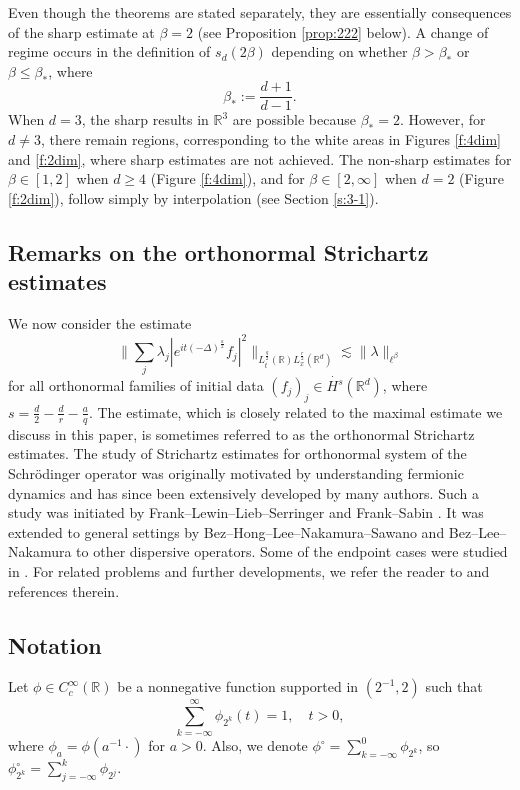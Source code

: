 \documentclass[a4paper]{amsart}
\numberwithin{figure}{section}
\numberwithin{equation}{section}%
\theoremstyle{plain}%
\theoremstyle{definition}
\theoremstyle{remark}%
\newcommand{\R}{{\mathbb R}}
\begin{document}
Even though the theorems are stated separately, they are essentially consequences of the sharp estimate at $\beta = 2$ (see Proposition \ref{prop:222} below). A change of regime occurs in the definition of $s_d(2\beta)$ depending on whether $\beta > \beta_\ast$ or $\beta \le \beta_\ast$, where
 \[\beta_\ast:=\frac{d+1}{d-1}.\] 
When $d = 3$, the sharp results in $\mathbb{R}^3$ are possible because $\beta_\ast = 2$. However, for $d \neq 3$, there remain regions, corresponding to the white areas in Figures \ref{f:4dim} and \ref{f:2dim}, where sharp estimates are not achieved. The non-sharp estimates for $\beta \in [1,2]$ when $d \ge 4$ (Figure \ref{f:4dim}), and for $\beta \in [2,\infty]$ when $d = 2$ (Figure \ref{f:2dim}), follow simply by interpolation (see Section \ref{s:3-1}).


\subsection{{Remarks on the orthonormal Strichartz estimates}}
We now consider the estimate
\begin{equation}
\label{e:onfs}
\Big\|\sum_j \lambda_j |e^{it(-\Delta)^{\frac a2}} f_j |^2\Big\|_{L_t^\frac q2(\R)L_x^\frac r2(\R^d)}
\lesssim
\|\lambda\|_{\ell^\beta}
\end{equation} 
for all orthonormal families of initial data $(f_j)_j\in \dot{H^s}(\R^d)$, where $s=\frac d2-\frac dr-\frac{a}q$.  The estimate, which is closely related to 
the maximal estimate we discuss in this paper, is sometimes referred to as the orthonormal Strichartz estimates.
The study of Strichartz estimates for orthonormal system of the Schr\"odinger operator was originally motivated by understanding fermionic dynamics and has since been extensively developed by many authors.
Such a study was initiated by Frank--Lewin--Lieb--Serringer \cite{FLLS} and Frank--Sabin \cite{FS_AJM}. It was extended to general  settings by Bez--Hong--Lee--Nakamura--Sawano \cite{BHLNS} and  Bez--Lee--Nakamura \cite{BLN_Forum} to other dispersive operators. Some of the endpoint cases were studied in \cite{BKS_TLMS, BKS_RIMS}. For related problems and further developments,  we refer the reader to \cite{CHP17,CHP18, FS_Survey, Ho23, Ho24, YLYL24} and references therein.

\subsection*{Notation}  
Let  $\phi\in C_c^\infty(\R)$ be a nonnegative function supported in $(2^{-1}, 2)$ such that 
\[ \sum_{k=-\infty}^\infty  \phi_{2^k} (t)=1, \quad t>0, \]
where $\phi_a=\phi(a^{-1}\cdot)$ for $a>0$. Also, we denote  $\phi^\circ=\sum_{k=-\infty}^0 \phi_{2^k}$,  so 
$ \phi_{2^k}^\circ= \sum_{j=-\infty}^k   \phi_{2^j}.$
\end{document}
